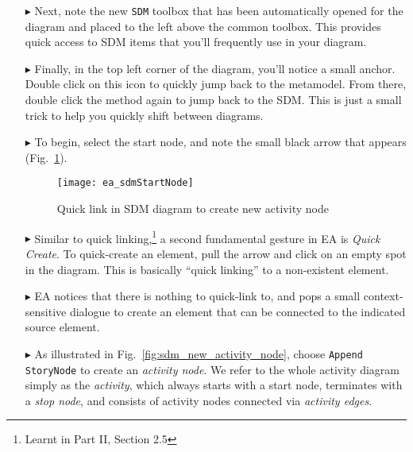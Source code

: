 \begin{itemize}
\vspace{0.5cm}

\item[$\blacktriangleright$] Next, note the new \texttt{SDM} toolbox that has been automatically opened for the diagram and placed to the left above
the common toolbox. This provides quick access to SDM items that you'll frequently use in your diagram.

\vspace{0.5cm}

\item[$\blacktriangleright$] Finally, in the top left corner of the diagram, you'll notice a small anchor. Double click on this icon to quickly jump back to the
metamodel. From there, double click the method again to jump back to the SDM. This is just a small trick to help you quickly shift between diagrams.

\vspace{0.5cm}

\item[$\blacktriangleright$] To begin, select the start node, and note the small black arrow that appears (Fig.~\ref{fig:sdm_quicklink}). 

\newpage

\begin{figure}[htp]
\begin{center}
  \texttt{[image: ea\_sdmStartNode]}
  \caption{Quick link in SDM diagram to create new activity node}  
  \label{fig:sdm_quicklink}
\end{center}
\end{figure}

\item[$\blacktriangleright$] Similar to quick linking,\footnote{Learnt in Part II, Section 2.5} a second fundamental gesture in EA is \emph{Quick
Create}.
To quick-create an element, pull the arrow and click on an empty spot in the diagram. This is basically ``quick linking'' to a non-existent element.

\item[$\blacktriangleright$] EA notices that there is nothing to quick-link to, and pops a small context-sensitive dialogue to create an element that can be
connected to the indicated source element.

\item[$\blacktriangleright$] As illustrated in Fig.~\ref{fig:sdm_new_activity_node}, choose \texttt{Append StoryNode} to create an \emph{activity
node}. We refer to the whole activity diagram simply as the \emph{activity}, which always starts with a start node, terminates with a \emph{stop node}, and
consists of activity nodes connected via \emph{activity edges}.


\end{itemize}
